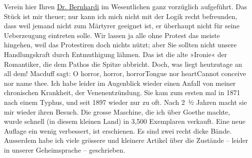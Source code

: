 \begin{ledgroupsized}[t]{13cm}
                    Verein hier Ihren \uline{Dr. Bernhardi} im Wesentlichen ganz vorzüglich aufgeführt. Das Stück ist mir theuer; nur
                    kann ich mich nicht mit der Logik recht befreunden, dass weil jemand nicht zum
                    Märtyrer geeignet ist, er überhaupt nicht für seine Ueberzeugung eintreten
                    solle. Wir lassen ja alle ohne Protest das meiste hingehen, weil das Protestiren
                    doch nichts nützt; aber Sie sollten nicht unsere Handlungskraft durch
                    Entmuthigung lähmen. Das ist die alte »Ironie« der Romantiker, die dem Pathos
                    die Spitze abbricht.\pend
           \pstart
           Doch, was liegt heutzutage an all dem! Macduff sagt:\pend
           \stanza{}O horror, horror, horror\newverse{}Tongue nor heart\newverse{}Cannot conceive nor name
                            thee.\stanzaend{}\pstart
           {\pb}Ich habe leider im
                    Augenblick wieder einen Anfall von meiner chronischen Krankheit, der
                    Venenentzündung. Sie kam zum ersten mal in 1871 nach einem Typhus,
                    und seit 1897 wieder nur zu oft. Nach 2 ½ Jahren macht sie mir
                    wieder ihren Besuch.\pend
           \pstart
           Die grosse Maschine, die ich
                    über Goethe machte, wurde schnell (in diesem
                    kleinen Land) in 3,500
                    Exemplaren verkauft. Eine neue Auflage ein wenig verbessert, ist erschienen. Es
                    sind zwei recht dicke Bände. Ausserdem habe ich viele grössere und kleinere
                    Artikel über die Zustände – leider in unserer Geheimsprache – geschrieben.\pend

\end{ledgroupsized}
